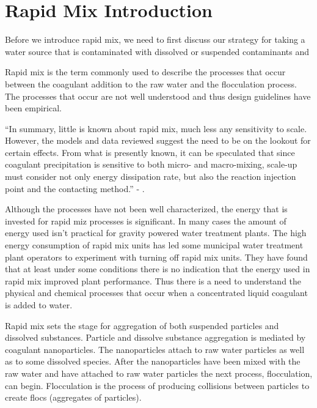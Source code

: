 \documentclass[letterpaper,10pt,english]{sphinxmanual}
\begin{document}
\chapter{Rapid Mix Introduction}
\label{\detokenize{Rapid_Mix/RM_Intro:rapid-mix-introduction}}\label{\detokenize{Rapid_Mix/RM_Intro:title-rapid-mix-designtroduction}}\label{\detokenize{Rapid_Mix/RM_Intro::doc}}
Before we introduce rapid mix, we need to first discuss our strategy for taking a water source that is contaminated with dissolved or suspended contaminants and

Rapid mix is the term commonly used to describe the processes that occur between the coagulant addition to the raw water and the flocculation process. The processes that occur are not well understood and thus design guidelines have been empirical.

“In summary, little is known about rapid mix, much less any sensitivity to scale. However, the models and data reviewed suggest the need to be on the lookout for certain effects. From what is presently known, it can be speculated that since coagulant precipitation is sensitive to both micro- and macro-mixing, scale-up must consider not only energy dissipation rate, but also the reaction injection point and the contacting method.” - .

Although the processes have not been well characterized, the energy that is invested for rapid miz processes is significant. In many cases the amount of energy used isn’t practical for gravity powered water treatment plants. The high energy consumption of rapid mix units has led some municipal water treatment plant operators to experiment with turning off rapid mix units. They have found that at least under some conditions there is no indication that the energy used in rapid mix improved plant performance. Thus there is a need to understand the physical and chemical processes that occur when a concentrated liquid coagulant is added to water.

Rapid mix sets the stage for aggregation of both suspended particles and dissolved substances. Particle and dissolve substance aggregation is mediated by coagulant nanoparticles. The nanoparticles attach to raw water particles as well as to some dissolved species. After the nanoparticles have been mixed with the raw water and have attached to raw water particles the next process, flocculation, can begin. Flocculation is the process of producing collisions between particles to create flocs (aggregates of particles).
\end{document}
